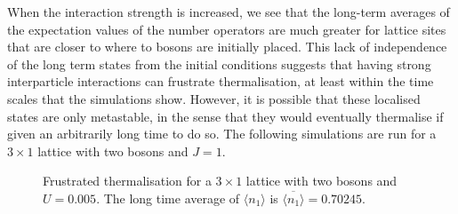 \documentclass[prb, twocolumn, final]{revtex4-1}
\theoremstyle{plain}
\begin{document}
When the interaction strength is increased, we see that the long-term averages of
the expectation values of the number operators are much greater for lattice
sites that are closer to where to bosons are initially placed. This lack of
independence of the long term states from the initial conditions suggests that
having strong interparticle interactions can frustrate thermalisation, at least
within the time scales that the simulations show. However, it is possible that
these localised states are only metastable, in the sense that they would
eventually thermalise if given an arbitrarily long time to do so. The
following simulations are run for a $3\times1$ lattice with two bosons and $J=1$.
\begin{figure}[H]
     \caption{Frustrated thermalisation for a $3\times 1$ lattice with two
              bosons and $U=0.005$. The long time average of $\langle n_{1}
              \rangle$ is $\overline{\langle n_1 \rangle}=0.70245.$}
\end{figure}
\end{document}
